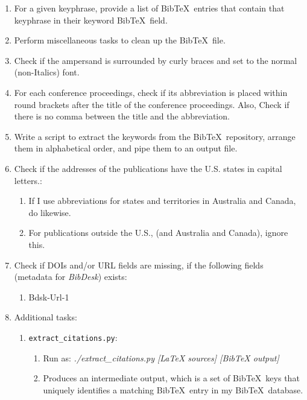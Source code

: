 \begin{enumerate}
\begin{enumerate}
	\end{enumerate}
\item For a given keyphrase, provide a list of {\sc Bib}\TeX\ entries that contain that keyphrase in their keyword {\sc Bib}\TeX\ field.
\item Perform miscellaneous tasks to clean up the {\sc Bib}\TeX\ file.
\item Check if the ampersand is surrounded by curly braces and set to the normal (non-Italics) font.
\item For each conference proceedings, check if its abbreviation is placed within round brackets after the title of the conference proceedings. Also, Check if there is no comma between the title and the abbreviation.
\item Write a script to extract the keywords from the {\sc Bib}\TeX\ repository, arrange them in alphabetical order, and pipe them to an output file.
\item Check if the addresses of the publications have the U.S. states in capital letters.: \vspace{-0.3cm}
	\begin{enumerate} \itemsep -2pt
	\item If I use abbreviations for states and territories in Australia and Canada, do likewise.
	\item For publications outside the U.S., (and Australia and Canada), ignore this.
	\end{enumerate}
\item Check if DOIs and/or URL fields are missing, if the following fields (metadata for {\it BibDesk}) exists: \vspace{-0.3cm}
	\begin{enumerate} \itemsep -2pt
	\item Bdsk-Url-1
	\end{enumerate}
\item Additional tasks: \vspace{-0.3cm}
	\begin{enumerate} \itemsep -2pt
	\item {\tt extract\_citations.py}: \vspace{-0.2cm}
		\begin{enumerate} \itemsep -2pt
		\item Run as: {\it ./extract\_citations.py [LaTeX sources] [BibTeX output]}
		\item Produces an intermediate output, which is a set of {\sc Bib}\TeX\ keys that uniquely identifies a matching {\sc Bib}\TeX\ entry in my {\sc Bib}\TeX\ database.

\end{enumerate}
\end{enumerate}
\end{enumerate}

